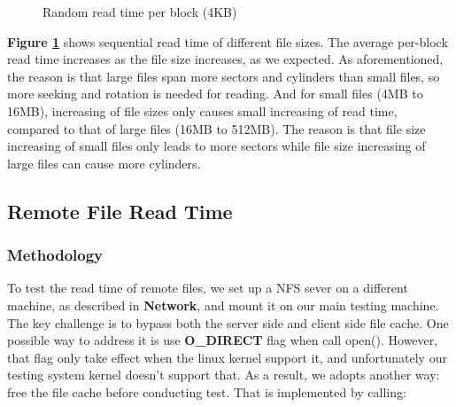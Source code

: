 \begin{figure}[ht]
    \centering
    \caption{Random read time per block (4KB)}
    \label{rand_read_time}
\end{figure}

\textbf{Figure \ref{rand_read_time}} shows sequential read time of different file sizes. The average per-block read time increases as the file size increases, as we expected. As aforementioned, the reason is that large files span more sectors and cylinders than small files, so more seeking and rotation is needed for reading. And for small files (4MB to 16MB), increasing of file sizes only causes small increasing of read time, compared to that of large files (16MB to 512MB).
The reason is that file size increasing of small files only leads to more sectors while file size increasing of large files can cause more cylinders.

\subsection{Remote File Read Time}

\subsubsection{Methodology}
To test the read time of remote files, we set up a NFS sever on a different machine, as described in \textbf{Network}, and mount it on our main testing machine. The key challenge is to bypass both the server side and client side file cache. One possible way to address it is use \textbf{O_DIRECT} flag when call open(). However, that flag only take effect when the linux kernel support it, and unfortunately our testing system kernel doesn't support that. As a result,
we adopts another way: free the file cache before conducting test. That is implemented by calling:

